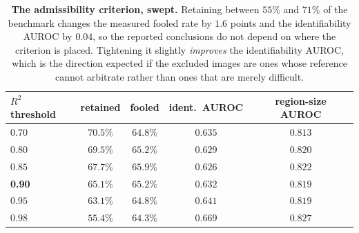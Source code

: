 \begin{table}[!ht]
\caption{\textbf{The admissibility criterion, swept.} Retaining between $55\%$ and
$71\%$ of the benchmark changes the measured fooled rate by $1.6$ points and the
identifiability AUROC by $0.04$, so the reported conclusions do not depend on where
the criterion is placed. Tightening it slightly \emph{improves} the identifiability
AUROC, which is the direction expected if the excluded images are ones whose
reference cannot arbitrate rather than ones that are merely difficult.}
\label{tab:supp-admissibility}
\begin{center}
\footnotesize
\begin{tabular}{lcccc}
\toprule
$R^2$ threshold & \textbf{retained} & \textbf{fooled} & \textbf{ident.\ AUROC} & \textbf{region-size AUROC} \\
\midrule
$0.70$ & $70.5\%$ & $64.8\%$ & $0.635$ & $0.813$ \\
$0.80$ & $69.5\%$ & $65.2\%$ & $0.629$ & $0.820$ \\
$0.85$ & $67.7\%$ & $65.9\%$ & $0.626$ & $0.822$ \\
\textbf{0.90} & $\mathbf{65.1\%}$ & $\mathbf{65.2\%}$ & $\mathbf{0.632}$ & $0.819$ \\
$0.95$ & $63.1\%$ & $64.8\%$ & $0.641$ & $0.819$ \\
$0.98$ & $55.4\%$ & $64.3\%$ & $0.669$ & $0.827$ \\
\bottomrule
\end{tabular}
\end{center}
\end{table}

